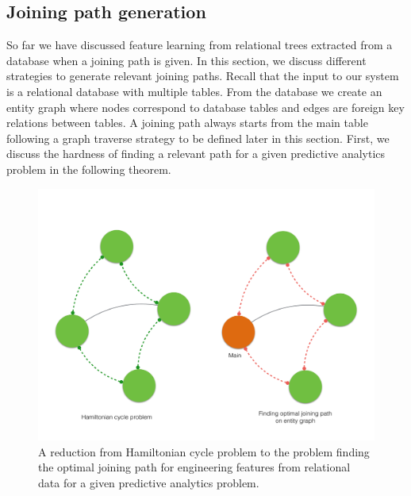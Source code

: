  \subsection{Joining path generation}
 So far we have discussed feature learning from relational trees extracted from a database when a joining path is given. In this section, we discuss different strategies to generate relevant joining paths. Recall that the input to our system is a relational database with multiple tables. From the database we create an entity graph where nodes correspond to database tables and edges are foreign key relations between tables. A joining path always starts from the main table following a graph traverse strategy to be defined later in this section. First, we discuss the hardness of finding a relevant path for a given predictive analytics problem in the following theorem.
\begin{figure}[tb]
    \centering
    \includegraphics[width=1.0\columnwidth]{./hamilton.pdf}
    \caption{A reduction from Hamiltonian cycle problem to the problem finding the optimal joining path for engineering features from relational data for a given predictive analytics problem.}
    \label{fig:np-hardness}
\end{figure}  
 
